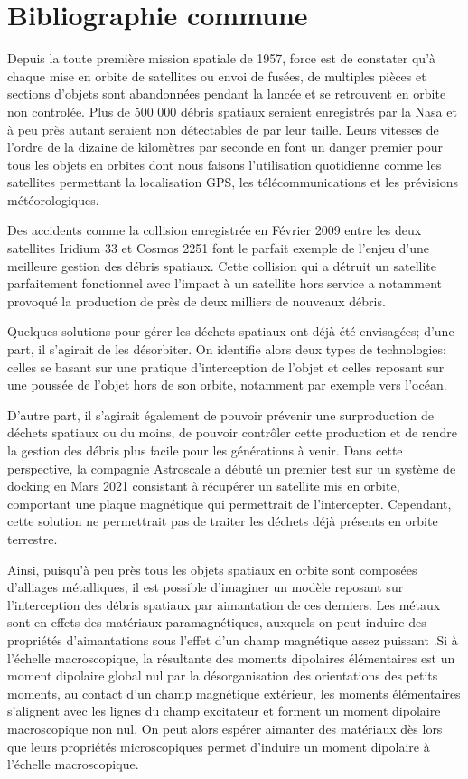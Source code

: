 \documentclass[a4paper,1pt]{article}
\begin{document}
\section{Bibliographie commune}
Depuis la toute première mission spatiale de 1957, force est de constater qu'à chaque mise en orbite de satellites ou envoi de fusées, de multiples pièces et sections d'objets sont abandonnées pendant la lancée et se retrouvent en orbite non controlée. Plus de 500 000 débris spatiaux seraient enregistrés par la Nasa et à peu près autant seraient non détectables de par leur taille. Leurs vitesses de l'ordre de la dizaine de kilomètres par seconde en font un danger premier pour tous les objets en orbites dont nous faisons l'utilisation quotidienne comme les satellites permettant la localisation GPS, les télécommunications et les prévisions météorologiques. \cite{Kurz1}

Des accidents comme la collision enregistrée en Février 2009 entre les deux satellites Iridium 33 et Cosmos 2251 \cite{CollExemple} font le parfait exemple de l'enjeu d'une meilleure gestion des débris spatiaux. Cette collision qui a détruit un satellite parfaitement fonctionnel avec l'impact à un satellite hors service a notamment provoqué la production de près de deux milliers de nouveaux débris. 

Quelques solutions \cite{SolExemples} pour gérer les déchets spatiaux ont déjà été envisagées; d'une part, il s'agirait de les désorbiter. On identifie alors deux types de technologies: celles se basant sur une pratique d'interception de l'objet et celles reposant sur une poussée de l'objet hors de son orbite, notamment par exemple vers l'océan. 

D'autre part, il s'agirait également de pouvoir prévenir une surproduction de déchets spatiaux ou du moins, de pouvoir contrôler cette production et de rendre la gestion des débris plus facile pour les générations à venir. Dans cette perspective, la compagnie Astroscale a débuté un premier test sur un système de docking en Mars 2021 \cite{Astroscale} consistant à récupérer un satellite mis en orbite, comportant une plaque magnétique qui permettrait de l'intercepter. Cependant, cette solution ne permettrait pas de traiter les déchets déjà présents en orbite terrestre.

Ainsi, puisqu'à peu près tous les objets spatiaux en orbite sont composées d'alliages métalliques, il est possible d'imaginer un modèle reposant sur l'interception des débris spatiaux par aimantation de ces derniers. Les métaux sont en effets des matériaux paramagnétiques, auxquels on peut induire des propriétés d'aimantations sous l'effet d'un champ magnétique assez puissant \cite{MatMagnetiques}.Si à l'échelle macroscopique, la résultante des moments dipolaires élémentaires est un moment dipolaire global nul par la désorganisation des orientations des petits moments, au contact d'un champ magnétique extérieur, les moments élémentaires s'alignent avec les lignes du champ excitateur et forment un moment dipolaire macroscopique non nul. On peut alors espérer aimanter des matériaux dès lors que leurs propriétés microscopiques permet d'induire un moment dipolaire à l'échelle macroscopique.
\end{document}
